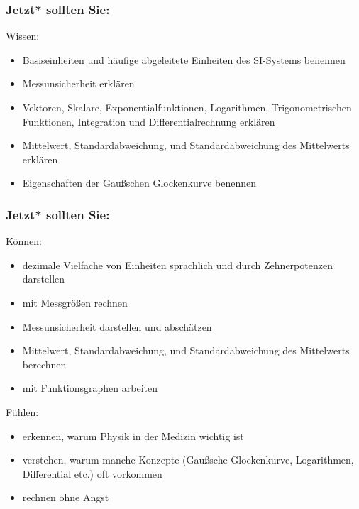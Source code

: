 \documentclass{beamer}
\begin{document}



\begin{frame}

\frametitle{Jetzt* sollten Sie:}



\begin{block}{Wissen:}
\begin{itemize}
\item
Basiseinheiten und häufige abgeleitete Einheiten des SI-Systems benennen
\item
Messunsicherheit erklären
\item
 Vektoren, Skalare, Exponentialfunktionen, Logarithmen, Trigonometrischen Funktionen, Integration und Differentialrechnung erklären
\item 
Mittelwert, Standardabweichung, und Standardabweichung des Mittelwerts erklären 
\item
Eigenschaften der Gaußschen Glockenkurve benennen
\end{itemize}
\end{block}

\end{frame}

\begin{frame}

\frametitle{Jetzt* sollten Sie:}
 



\begin{block}{Können:}
\begin{itemize}
\item
 dezimale Vielfache von Einheiten sprachlich und durch Zehnerpotenzen darstellen
\item
 mit Messgrößen rechnen
\item
 Messunsicherheit darstellen und abschätzen
\item
 Mittelwert, Standardabweichung, und Standardabweichung des Mittelwerts berechnen
\item 
mit Funktionsgraphen arbeiten
\end{itemize}
\end{block}

 
\begin{block}{Fühlen:}
\begin{itemize}
\item
erkennen, warum Physik in der Medizin wichtig ist
\item
verstehen, warum manche Konzepte (Gaußsche Glockenkurve, Logarithmen, Differential etc.) oft vorkommen
\item
 rechnen ohne Angst
\end{itemize}
\end{block}

\end{frame}
\end{document}
